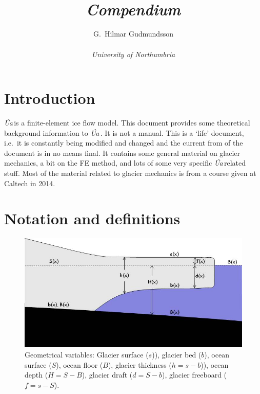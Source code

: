 \documentclass[10pt,a4paper]{book}
\title{\Ua\\{\it Compendium}}
\author{G.~Hilmar Gudmundsson\\ \\ \textit{University of Northumbria}}
\newcommand{\Ua}{\textsl{\'Ua}\,}
\begin{document}
\maketitle
\tableofcontents

\frontmatter



\chapter{Introduction}
\Ua is a finite-element ice flow model.  This document provides some
theoretical background information to \Ua. It is not a manual. This is
a `life' document, i.e.\ it is constantly being modified and changed
and the current from of the document is in no means final. It contains
some general material on glacier mechanics, a bit on the FE method,
and lots of some very specific \Ua related stuff.  Most of the
material related to glacier mechanics is from a course given
at Caltech in 2014.

\chapter{Notation and definitions}



\begin{figure}
\centerline{\includegraphics[width=12cm]{ProblemGeometry.jpg}}
\caption{Geometrical variables: Glacier surface ($s$)), glacier bed ($b$), ocean surface ($S$), ocean floor ($B$), 
glacier thickness ($h=s-b$)), ocean depth ($H=S-B$), glacier draft ($d=S-b$), glacier freeboard ($f=s-S$). 
\label{fig:PG}}
\end{figure}
\end{document}
